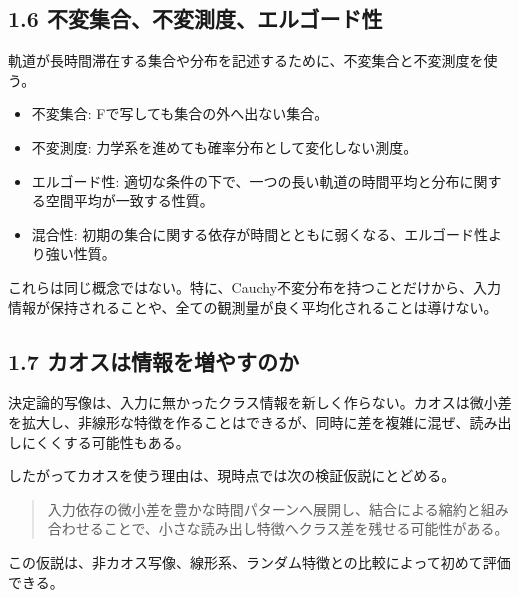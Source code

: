 \documentclass[11pt,a4paper]{ltjsarticle}
\newenvironment{keyquote}{%
  \begin{quote}\color{researchteal}\bfseries\large%
}{%
  \end{quote}%
}
\begin{document}
\subsection*{\textcolor{researchblue}{1.6 不変集合、不変測度、エルゴード性}}

軌道が長時間滞在する集合や分布を記述するために、不変集合と不変測度を使う。\par

\begin{itemize}

\item 不変集合: Fで写しても集合の外へ出ない集合。

\item 不変測度: 力学系を進めても確率分布として変化しない測度。

\item エルゴード性: 適切な条件の下で、一つの長い軌道の時間平均と分布に関する空間平均が一致する性質。

\item 混合性: 初期の集合に関する依存が時間とともに弱くなる、エルゴード性より強い性質。

\end{itemize}

これらは同じ概念ではない。特に、Cauchy不変分布を持つことだけから、入力情報が保持されることや、全ての観測量が良く平均化されることは導けない。\par

\subsection*{\textcolor{researchblue}{1.7 カオスは情報を増やすのか}}

決定論的写像は、入力に無かったクラス情報を新しく作らない。カオスは微小差を拡大し、非線形な特徴を作ることはできるが、同時に差を複雑に混ぜ、読み出しにくくする可能性もある。\par

したがってカオスを使う理由は、現時点では次の検証仮説にとどめる。\par

\begin{keyquote}

入力依存の微小差を豊かな時間パターンへ展開し、結合による縮約と組み合わせることで、小さな読み出し特徴へクラス差を残せる可能性がある。

\end{keyquote}

この仮説は、非カオス写像、線形系、ランダム特徴との比較によって初めて評価できる。\par
\end{document}
